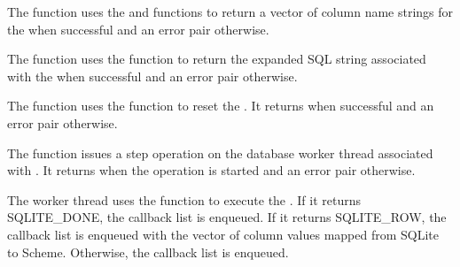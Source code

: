 \begin{function}
\end{function}

The  function uses the
 and 
functions to return a vector of column name strings for the
 when successful and an error pair otherwise.

\begin{function}
\end{function}

The  function uses the
 function to return the expanded SQL
string associated with the  when successful and an
error pair otherwise.

\begin{function}
\end{function}

The  function uses the
 function to reset the . It
returns  when successful and an error pair otherwise.

\begin{function}
\end{function}

The  function issues a step operation on
the database worker thread associated with . It returns
 when the operation is started and an error pair otherwise.

The worker thread uses the  function to execute
the . If it returns SQLITE\_DONE, the callback list
 is enqueued. If it returns SQLITE\_ROW,
the callback list  is
enqueued with the vector of column values mapped from SQLite to
Scheme. Otherwise, the callback list  is enqueued.

\begin{function}
\end{function}


